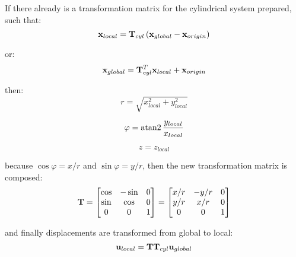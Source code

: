 \begin{bbox}
    If there already is a transformation matrix for the cylindrical system
    prepared, such that:
    \begin{equation}
        \mathbf{x}_{local} = \mathbf{T}_{cyl} \left( \mathbf{x}_{global} - \mathbf{x}_{origin} \right)
    \end{equation}

    or:
    \begin{equation}
        \mathbf{x}_{global} = \mathbf{T}_{cyl}^T \mathbf{x}_{local} + \mathbf{x}_{origin}
    \end{equation}

    then:
    \begin{equation}
        r = \sqrt{x_{local}^2 + y_{local}^2}
    \end{equation}

    \begin{equation}
        \varphi = \operatorname{atan2} \frac{y_{local}}{x_{local}}
    \end{equation}

    \begin{equation}
        z = z_{local}
    \end{equation}

    because $ \cos \varphi = x / r $ and $ \sin \varphi = y / r $,
    then the new transformation matrix is composed:
    \begin{equation}
        \mathbf{T} = \begin{bmatrix}
            \cos & -\sin & 0 \\
            \sin & \cos & 0 \\
            0 & 0 & 1\\
        \end{bmatrix}
        = \begin{bmatrix}
            x / r & -y/r & 0 \\
            y/r & x/r & 0 \\
            0 & 0 & 1 \\
        \end{bmatrix}
    \end{equation}

    and finally displacements are transformed from global to local:
    \begin{equation}
        \mathbf{u}_{local} = \mathbf{T} \mathbf{T}_{cyl} \mathbf{u}_{global}
    \end{equation}
\end{bbox}



